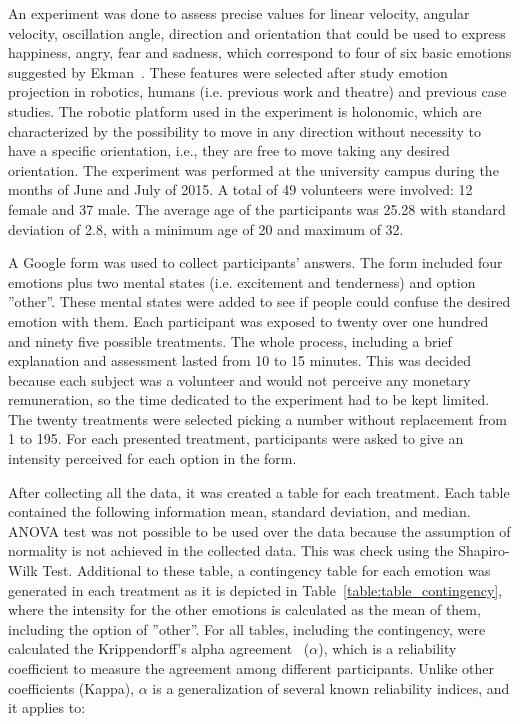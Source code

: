 An experiment was done to assess precise values for linear velocity, angular velocity, oscillation angle, direction and orientation that could be used to express happiness, angry, fear and sadness, which correspond to four of six basic emotions suggested by Ekman~\cite{Ekman2001}. These features were selected after study emotion projection in robotics, humans (i.e. previous work and theatre) and previous case studies. The robotic platform used in the experiment is holonomic, which are characterized by the possibility to move in any direction without necessity to have a specific orientation, i.e., they are free to move taking any desired orientation. The experiment was performed at the university campus during the months of June and July of 2015.  A total of 49 volunteers were involved: 12 female and 37 male. The average age of the participants was 25.28 with standard deviation of 2.8, with a minimum age of 20 and maximum of 32. 

A Google form was used to collect participants' answers. The form included four emotions plus two mental states (i.e. excitement and tenderness) and option ''other''. These mental states were added to see if people could confuse the desired emotion with them. Each participant was exposed to twenty over one hundred and ninety five possible treatments. The whole process, including a brief explanation and assessment lasted  from 10 to 15 minutes. This was decided because each subject was a volunteer and would not perceive any monetary remuneration, so the time dedicated to the experiment had to be kept limited. The twenty treatments were selected picking a number without replacement from 1 to 195. For each presented treatment, participants were asked to give an intensity perceived for each option in the form. 

After collecting all the data, it was created a table for each treatment. Each table contained the following information mean, standard deviation, and median. ANOVA test was not possible to be used over the data because the assumption of normality is not achieved in the collected data. This was check using the Shapiro-Wilk Test.
Additional to these table, a contingency table for each emotion was generated in each treatment as it is depicted in  Table~\ref{table:table_contingency},  where the intensity for the other emotions is calculated as the mean of them, including the option of ''other''. For all tables, including the contingency, were calculated the Krippendorff's alpha agreement~\cite{Krippendorff2007} ($\alpha$), which is a reliability coefficient to measure the agreement among different participants. Unlike other coefficients (Kappa), $\alpha$ is a generalization of several known reliability indices, and it applies to:

